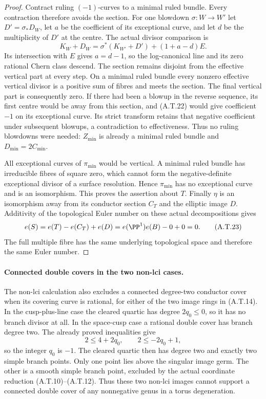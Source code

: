 \begin{proof}
Contract ruling $(-1)$-curves to a minimal ruled bundle.
Every contraction therefore avoids the section. For
one blowdown $\sigma:W\to W'$ let $D'=\sigma_*D_W$,
let $a$ be the coefficient of its exceptional curve,
and let $d$ be the multiplicity of $D'$ at the centre.
The actual divisor comparison is
\[
 K_W+D_W=\sigma^*(K_{W'}+D')+(1+a-d)E.
                                                        \tag{A.T.22}
\]
Its intersection with $E$ gives $a=d-1$, so the
log-canonical line and its zero rational Chern class
descend. The section remains disjoint from the
effective vertical part at every step. On a minimal
ruled bundle every nonzero effective vertical divisor
is a positive sum of fibres and meets the section.
The final vertical part is consequently zero. If
there had been a blowup in the reverse sequence,
its first centre would be away from this section,
and (A.T.22) would give coefficient $-1$ on its
exceptional curve. Its strict transform retains that
negative coefficient under subsequent blowups, a
contradiction to effectiveness. Thus no ruling
blowdowns were needed: $Z_{\min}$ is already a
minimal ruled bundle and $D_{\min}=2C_{\min}$.

All exceptional curves of $\pi_{\min}$ would be
vertical. A minimal ruled bundle has irreducible
fibres of square zero, which cannot form the
negative-definite exceptional divisor of a surface
resolution. Hence $\pi_{\min}$ has no exceptional
curve and is an isomorphism. This proves the assertion
about $T$. Finally $\eta$ is an isomorphism away from
its conductor section $C_T$ and the elliptic image
$D$. Additivity of the topological Euler number on
these actual decompositions gives
\[
 e(S)=e(T)-e(C_T)+e(D)
      =e(\PP^1)e(B)-0+0=0.                       \tag{A.T.23}
\]
The full multiple fibre has the same underlying
topological space and therefore the same Euler number.
\end{proof}

\paragraph{Connected double covers in the two non-lci cases.}
The non-lci calculation also excludes a connected
degree-two conductor cover when its covering curve
is rational, for either of the two image rings in
(A.T.14). In the cusp-plus-line case the cleared
quartic has degree $2q_0\le0$, so it has no branch
divisor at all. In the space-cusp case a rational
double cover has branch degree two. The already
proved inequalities give
\[
                2\le4+2q_0,\qquad 2\le-2q_0+1,
\]
so the integer $q_0$ is $-1$. The cleared quartic
then has degree two and exactly two simple branch
points. Only one point lies above the singular
image germ. The other is a smooth simple branch
point, excluded by the actual coordinate reduction
(A.T.10)--(A.T.12). Thus these two non-lci images
cannot support a connected double cover of any
nonnegative genus in a torus degeneration.

